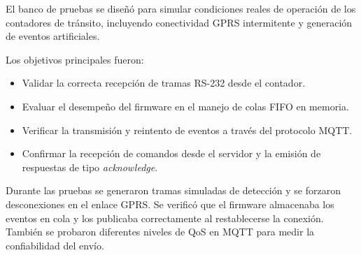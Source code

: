 El banco de pruebas se diseñó para simular condiciones reales de operación de los contadores de tránsito, 
incluyendo conectividad GPRS intermitente y generación de eventos artificiales.  


Los objetivos principales fueron:  
\begin{itemize}
    \item Validar la correcta recepción de tramas RS-232 desde el contador.
    \item Evaluar el desempeño del firmware en el manejo de colas FIFO en memoria.
    \item Verificar la transmisión y reintento de eventos a través del protocolo MQTT.
    \item Confirmar la recepción de comandos desde el servidor y la emisión de respuestas de tipo \textit{acknowledge}.
\end{itemize}

Durante las pruebas se generaron tramas simuladas de detección y se forzaron desconexiones en el enlace GPRS. 
Se verificó que el firmware almacenaba los eventos en cola y los publicaba correctamente al restablecerse la conexión. 
También se probaron diferentes niveles de QoS en MQTT para medir la confiabilidad del envío.  


